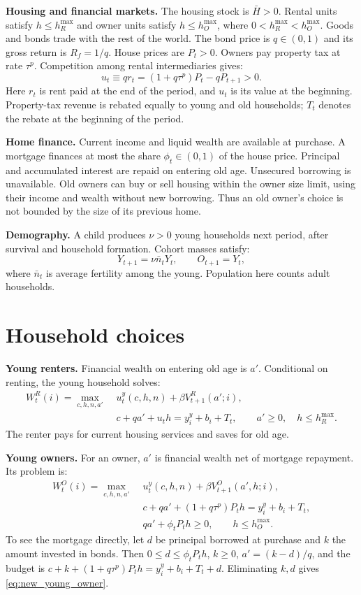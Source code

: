 \documentclass[11pt]{article}
\begin{document}
\textbf{Housing and financial markets.} The housing stock is $\bar H>0$.
Rental units satisfy $h\le h_R^{\max}$ and owner units satisfy
$h\le h_O^{\max}$, where $0<h_R^{\max}<h_O^{\max}$. Goods and bonds trade with
the rest of the world. The bond price is $q\in(0,1)$ and its gross return is
$R_f=1/q$. House prices are $P_t>0$. Owners pay property tax at rate $\tau^p$.
Competition among rental intermediaries gives:
\begin{equation}
u_t\equiv qr_t=(1+q\tau^p)P_t-qP_{t+1}>0.
\label{eq:new_usercost}
\end{equation}
Here $r_t$ is rent paid at the end of the period, and $u_t$ is its value at
the beginning. Property-tax revenue is rebated equally to young and old
households; $T_t$ denotes the rebate at the beginning of the period.

\textbf{Home finance.} Current income and liquid wealth are available at
purchase. A mortgage finances at most the share $\phi_t\in(0,1)$ of the house
price. Principal and accumulated interest are repaid on entering old age.
Unsecured borrowing is unavailable. Old owners can buy or sell housing within
the owner size limit, using their income and wealth without new borrowing.
Thus an old owner's choice is not bounded by the size of its previous home.

\textbf{Demography.} A child produces $\nu>0$ young households next period,
after survival and household formation. Cohort masses satisfy:
\begin{equation}
Y_{t+1}=\nu\bar n_tY_t,\qquad O_{t+1}=Y_t,
\label{eq:new_demography}
\end{equation}
where $\bar n_t$ is average fertility among the young. Population here counts
adult households.

\section{Household choices}

\textbf{Young renters.} Financial wealth on entering old age is $a'$.
Conditional on renting, the young household solves:
\begin{align}
W_t^R(i)=\max_{c,h,n,a'}\;&u_t^y(c,h,n)+\beta V_{t+1}^R(a';i),\nonumber\\
&c+qa'+u_th=y_i^y+b_i+T_t,\qquad a'\ge0,\quad h\le h_R^{\max}.
\label{eq:new_young_renter}
\end{align}
The renter pays for current housing services and saves for old age.

\textbf{Young owners.} For an owner, $a'$ is financial wealth net of mortgage
repayment. Its problem is:
\begin{align}
W_t^O(i)=\max_{c,h,n,a'}\;&u_t^y(c,h,n)+\beta V_{t+1}^O(a',h;i),\nonumber\\
&c+qa'+(1+q\tau^p)P_th=y_i^y+b_i+T_t,\nonumber\\
&qa'+\phi_tP_th\ge0,\qquad h\le h_O^{\max}.
\label{eq:new_young_owner}
\end{align}
To see the mortgage directly, let $d$ be principal borrowed at purchase and
$k$ the amount invested in bonds. Then $0\le d\le\phi_tP_th$, $k\ge0$,
$a'=(k-d)/q$, and the budget is
$c+k+(1+q\tau^p)P_th=y_i^y+b_i+T_t+d$.
Eliminating $k,d$ gives \eqref{eq:new_young_owner}.
\end{document}
